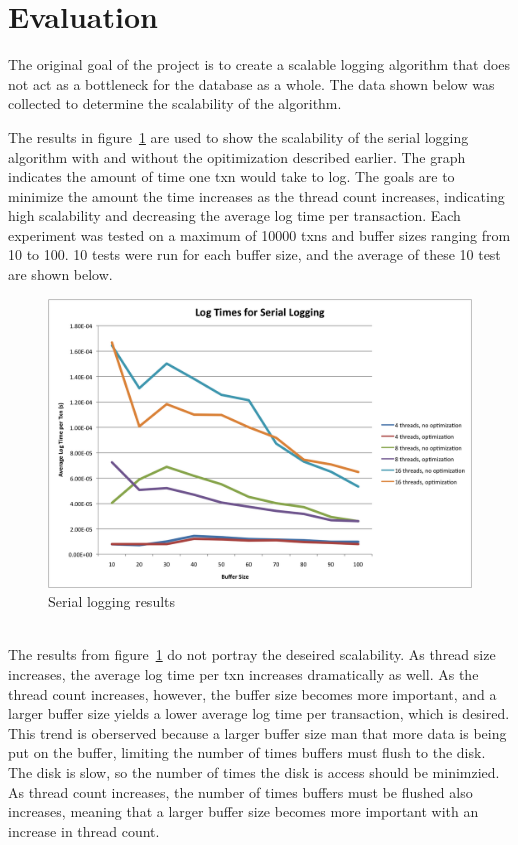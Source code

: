 \section{Evaluation}


The original goal of the project is to create a scalable logging algorithm that does not act as a bottleneck for the database as a whole. The data shown below was collected to determine the scalability of the algorithm. \par

The results in figure~\ref{serialresults} are used to show the scalability of the serial logging algorithm with and without the  opitimization described earlier.  The graph indicates the amount of time one txn would take to log. The goals are to minimize the amount the time increases as the thread count increases, indicating high scalability and decreasing the average log time per transaction. Each experiment  was tested on a maximum of 10000 txns and buffer sizes ranging from 10 to 100. 10 tests were run for each buffer size, and the average of these 10 test are shown below. \par 

\begin{figure}[!h]
  \includegraphics[width=\textwidth]{results.png}
  \caption{Serial logging results}
  \label{serialresults}
\end{figure}\\

The results from figure~\ref{serialresults} do not portray the deseired scalability. As thread size increases, the average log time per txn increases dramatically as well. As the thread count increases, however, the buffer size becomes more important, and a larger buffer size yields a lower average log time per transaction, which is desired. This trend is oberserved because a larger buffer size man that more data is being put on the buffer, limiting the number of times buffers must flush to the disk. The disk is slow, so the number of times the disk is access should be minimzied. As thread count increases, the number of times buffers must be flushed also increases, meaning that a larger buffer size becomes more important with an increase in thread count. \par

